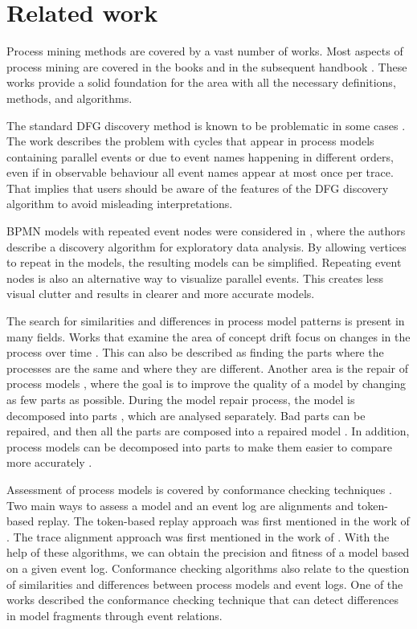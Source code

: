 \documentclass[11pt]{article}
\theoremstyle{definition}
\begin{document}
\section{Related work}\label{sec:related}

Process mining methods are covered by a vast number of works. 
Most aspects of process mining are covered in the books \citep{Aalst16,Burattin15,MansAV15} and in the subsequent handbook \citep{van2022process}. These works provide a solid foundation for the area with all the necessary definitions, methods, and algorithms.

The standard DFG discovery method is known to be problematic in some cases \citep{Van_der_Aalst2019-sp}. The work describes the problem with cycles that appear in process models containing parallel events or due to event names happening in different orders, even if in observable behaviour all event names appear at most once per trace. That implies that users should be aware of the features of the DFG discovery algorithm to avoid misleading interpretations.

BPMN models with repeated event nodes were considered in \cite{Lieben2018-st}, where the authors describe a discovery algorithm for exploratory data analysis. By allowing vertices to repeat in the models, the resulting models can be simplified. Repeating event nodes is also an alternative way to visualize parallel events. This creates less visual clutter and results in clearer and more accurate models.

The search for similarities and differences in process model patterns is present in many fields. Works that examine the area of concept drift focus on changes in the process over time \citep{Bose2011-hg, Bose2014-by}. This can also be described as finding the parts where the processes are the same and where they are different. Another area is the repair of process models \citep{FahlandA15,MitsyukLA17,PolyvyanyyAHW17}, where the goal is to improve the quality of a model by changing as few parts as possible. During the model repair process, the model is decomposed into parts \citep{Aalst13}, which are analysed separately. 
Bad parts can be repaired, and then all the parts are composed into a repaired model \citep{MitsyukLA17}. 
In addition, process models can be decomposed into parts to make them easier to compare more accurately \citep{BrockhoffGUA24}.

Assessment of process models is covered by conformance checking techniques \citep{CarmonaDSW18,Munoz-Gama16}. Two main ways to assess a model and an event log are alignments and token-based replay. The token-based replay approach was first mentioned in the work of \cite{Rozinat2008-bd}. The trace alignment approach was first mentioned in the work of \cite{Van_der_Aalst2012-kp}. With the help of these algorithms, we can obtain the precision and fitness of a model based on a given event log. Conformance checking algorithms also relate to the question of similarities and differences between process models and event logs. One of the works \citep{Artamonov2019-vq} described the conformance checking technique that can detect differences in model fragments through event relations. 
\end{document}
